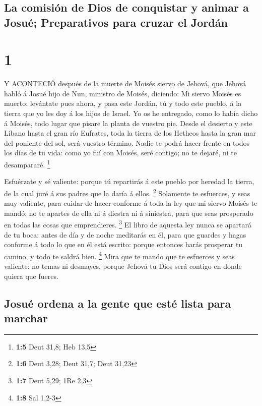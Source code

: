 \hypertarget{la-comisiuxf3n-de-dios-de-conquistar-y-animar-a-josuuxe9-preparativos-para-cruzar-el-jorduxe1n}{%
\subsection{La comisión de Dios de conquistar y animar a Josué;
Preparativos para cruzar el
Jordán}\label{la-comisiuxf3n-de-dios-de-conquistar-y-animar-a-josuuxe9-preparativos-para-cruzar-el-jorduxe1n}}

\hypertarget{section}{%
\section{1}\label{section}}

 Y ACONTECIÓ después de la muerte de Moisés siervo de
Jehová, que Jehová habló á Josué hijo de Nun, ministro de Moisés,
diciendo:  Mi siervo Moisés es muerto: levántate pues ahora,
y pasa este Jordán, tú y todo este pueblo, á la tierra que yo les doy á
los hijos de Israel.  Yo os he entregado, como lo había
dicho á Moisés, todo lugar que pisare la planta de vuestro pie.
 Desde el desierto y este Líbano hasta el gran río Eufrates,
toda la tierra de los Hetheos hasta la gran mar del poniente del sol,
será vuestro término.  Nadie te podrá hacer frente en todos
los días de tu vida: como yo fuí con Moisés, seré contigo; no te dejaré,
ni te desampararé. \footnote{\textbf{1:5} Deut 31,8; Heb 13,5}

 Esfuérzate y sé valiente: porque tú repartirás á este
pueblo por heredad la tierra, de la cual juré á sus padres que la daría
á ellos. \footnote{\textbf{1:6} Deut 3,28; Deut 31,7; Deut 31,23}
 Solamente te esfuerces, y seas muy valiente, para cuidar de
hacer conforme á toda la ley que mi siervo Moisés te mandó: no te
apartes de ella ni á diestra ni á siniestra, para que seas prosperado en
todas las cosas que emprendieres. \footnote{\textbf{1:7} Deut 5,29; 1Re
  2,3}  El libro de aquesta ley nunca se apartará de tu
boca: antes de día y de noche meditarás en él, para que guardes y hagas
conforme á todo lo que en él está escrito: porque entonces harás
prosperar tu camino, y todo te saldrá bien. \footnote{\textbf{1:8} Sal
  1,2-3}  Mira que te mando que te esfuerces y seas
valiente: no temas ni desmayes, porque Jehová tu Dios será contigo en
donde quiera que fueres.

\hypertarget{josuuxe9-ordena-a-la-gente-que-estuxe9-lista-para-marchar}{%
\subsection{Josué ordena a la gente que esté lista para
marchar}\label{josuuxe9-ordena-a-la-gente-que-estuxe9-lista-para-marchar}}

